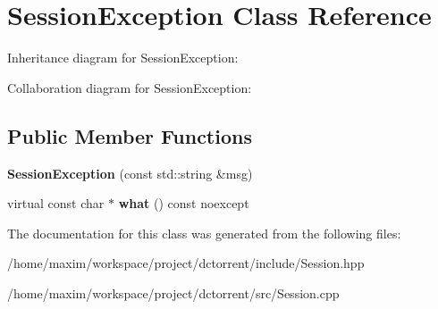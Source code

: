 \hypertarget{class_session_exception}{}\section{Session\+Exception Class Reference}
\label{class_session_exception}


Inheritance diagram for Session\+Exception\+:


Collaboration diagram for Session\+Exception\+:
\subsection*{Public Member Functions}
\begin{DoxyCompactItemize}
\item 
\mbox{\label{class_session_exception_a9b5db8bd5748d69b5d533850118f9a4b}} 
{\bfseries Session\+Exception} (const std\+::string \&msg)
\item 
\mbox{\label{class_session_exception_a50439e6eb93e97cdc80da54fa00836a7}} 
virtual const char $\ast$ {\bfseries what} () const noexcept
\end{DoxyCompactItemize}


The documentation for this class was generated from the following files\+:\begin{DoxyCompactItemize}
\item 
/home/maxim/workspace/project/dctorrent/include/Session.\+hpp\item 
/home/maxim/workspace/project/dctorrent/src/Session.\+cpp\end{DoxyCompactItemize}
